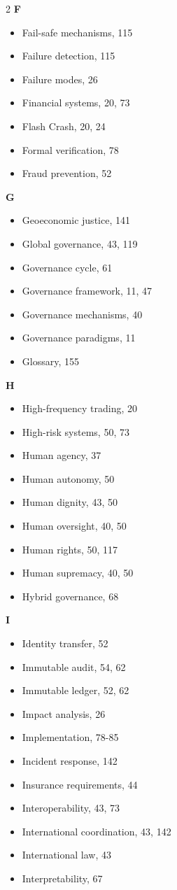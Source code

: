 \begin{multicols}{2}
\textbf{F}
\begin{itemize}[leftmargin=0.5cm]
\item Fail-safe mechanisms, 115
\item Failure detection, 115
\item Failure modes, 26
\item Financial systems, 20, 73
\item Flash Crash, 20, 24
\item Formal verification, 78
\item Fraud prevention, 52
\end{itemize}

\textbf{G}
\begin{itemize}[leftmargin=0.5cm]
\item Geoeconomic justice, 141
\item Global governance, 43, 119
\item Governance cycle, 61
\item Governance framework, 11, 47
\item Governance mechanisms, 40
\item Governance paradigms, 11
\item Glossary, 155
\end{itemize}

\textbf{H}
\begin{itemize}[leftmargin=0.5cm]
\item High-frequency trading, 20
\item High-risk systems, 50, 73
\item Human agency, 37
\item Human autonomy, 50
\item Human dignity, 43, 50
\item Human oversight, 40, 50
\item Human rights, 50, 117
\item Human supremacy, 40, 50
\item Hybrid governance, 68
\end{itemize}

\textbf{I}
\begin{itemize}[leftmargin=0.5cm]
\item Identity transfer, 52
\item Immutable audit, 54, 62
\item Immutable ledger, 52, 62
\item Impact analysis, 26
\item Implementation, 78-85
\item Incident response, 142
\item Insurance requirements, 44
\item Interoperability, 43, 73
\item International coordination, 43, 142
\item International law, 43
\item Interpretability, 67
\end{itemize}


\end{multicols}
